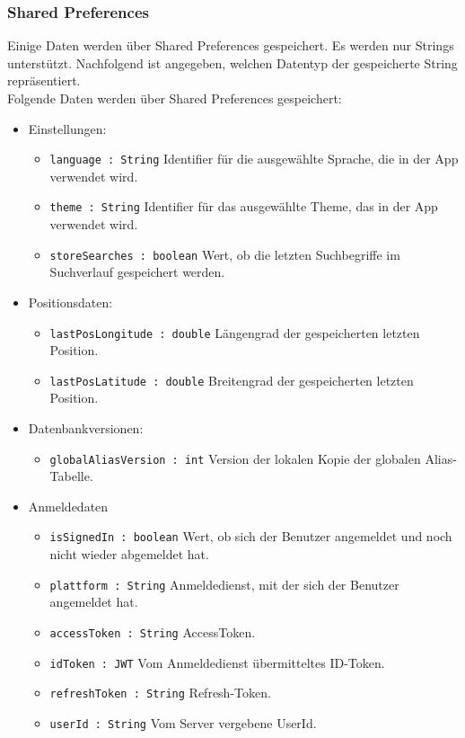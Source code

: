 \subsubsection{Shared Preferences}\label{App_DataManagement_SharedPreferences}
Einige Daten werden über Shared Preferences gespeichert. Es werden nur Strings unterstützt. 
Nachfolgend ist angegeben, welchen Datentyp der gespeicherte String repräsentiert.\\
Folgende Daten werden über Shared Preferences gespeichert:

\begin{itemize}
    \item Einstellungen: 
    \begin{itemize}
        \item \texttt{language : String} Identifier für die ausgewählte Sprache, die in der App verwendet wird.
        \item \texttt{theme : String} Identifier für das ausgewählte Theme, das in der App verwendet wird.
        \item \texttt{storeSearches : boolean} Wert, ob die letzten Suchbegriffe im Suchverlauf gespeichert werden.
    \end{itemize}
    \item Positionsdaten:
    \begin{itemize}
        \item \texttt{lastPosLongitude : double} Längengrad der gespeicherten letzten Position.
        \item \texttt{lastPosLatitude : double} Breitengrad der gespeicherten letzten Position.
    \end{itemize}
    \item Datenbankversionen:
    \begin{itemize}
        \item \texttt{globalAliasVersion : int} Version der lokalen Kopie der globalen Alias-Tabelle.
    \end{itemize}
    \item Anmeldedaten
    \begin{itemize}
        \item \texttt{isSignedIn : boolean} Wert, ob sich der Benutzer angemeldet und noch nicht wieder abgemeldet hat.
        \item \texttt{plattform : String} Anmeldedienst, mit der sich der Benutzer angemeldet hat.
        \item \texttt{accessToken : String} AccessToken.
        \item \texttt{idToken : JWT} Vom Anmeldedienst übermitteltes ID-Token.
        \item \texttt{refreshToken : String} Refresh-Token.
        \item \texttt{userId : String} Vom Server vergebene UserId.
    \end{itemize}
\end{itemize}
